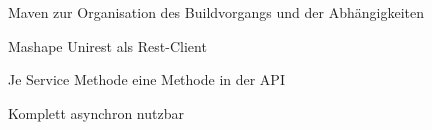 \begin{frame}

\begin{block}{}
	Maven zur Organisation des Buildvorgangs und der Abhängigkeiten
\end{block}
\begin{block}{}
	Mashape Unirest als Rest-Client
\end{block}
\begin{block}{}
	Je Service Methode eine Methode in der API
\end{block}
\begin{block}{}
	Komplett asynchron nutzbar
\end{block}

\end{frame}